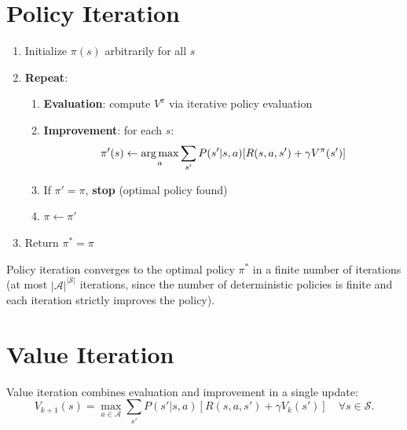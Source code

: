 \section{Policy Iteration}

\begin{algorithme}[title=\textbf{Policy Iteration}]
\begin{enumerate}
    \item Initialize $\pi(s)$ arbitrarily for all $s$
    \item \textbf{Repeat}:
    \begin{enumerate}
        \item \textbf{Evaluation}: compute $V^\pi$ via iterative policy evaluation
        \item \textbf{Improvement}: for each $s$:
        \[
            \pi'(s) \leftarrow \operatorname*{arg\,max}_a \sum_{s'} P(s'|s,a)[R(s,a,s') + \gamma V^\pi(s')]
        \]
        \item If $\pi' = \pi$, \textbf{stop} (optimal policy found)
        \item $\pi \leftarrow \pi'$
    \end{enumerate}
    \item Return $\pi^* = \pi$
\end{enumerate}
\end{algorithme}

\begin{theorem}
Policy iteration converges to the optimal policy $\pi^*$ in a finite number
of iterations (at most $|\mathcal{A}|^{|\mathcal{S}|}$ iterations, since
the number of deterministic policies is finite and each iteration strictly
improves the policy).
\end{theorem}

\section{Value Iteration}

\begin{definition}
Value iteration combines evaluation and improvement in a single update:
\[
    V_{k+1}(s) = \max_{a \in \mathcal{A}} \sum_{s'} P(s'|s,a)
    [R(s,a,s') + \gamma V_k(s')] \quad \forall s \in \mathcal{S}.
\]
\end{definition}

